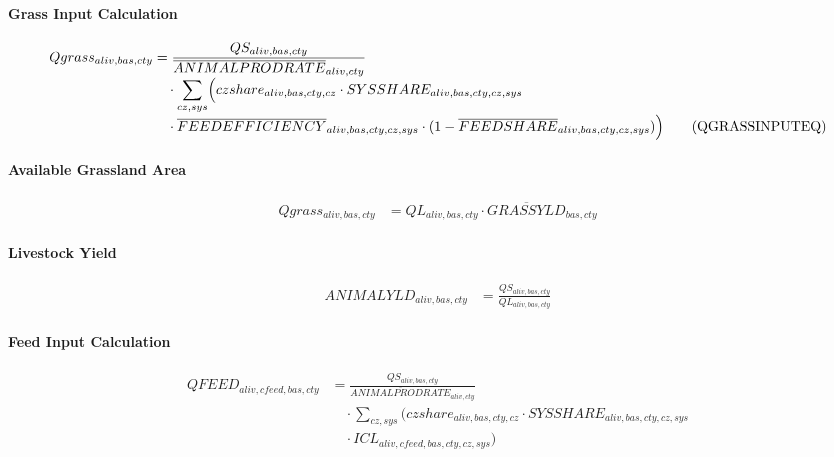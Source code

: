 \paragraph{Grass Input Calculation}
\begin{align}
  Qgrass_{aliv,bas,cty}
  &= 
     \frac{
       QS_{aliv,bas,cty}
     }{
       \overline{ANIMALPRODRATE}_{aliv,cty}
     }
     \nonumber\\[-0.3em]
  &\quad
     \cdot
     \sum_{cz,sys}
     \Bigl(
       czshare_{aliv,bas,cty,cz}
       \cdot
       SYSSHARE_{aliv,bas,cty,cz,sys}
       \nonumber\\[-0.3em]
  &\quad
       \cdot
       \overline{FEEDEFFICIENCY}_{aliv,bas,cty,cz,sys}
       \cdot
       (1 - \overline{FEEDSHARE}_{aliv,bas,cty,cz,sys})
     \Bigr)
  \tag{QGRASSINPUTEQ}\label{eq:QGRASSINPUTEQ}
\end{align}

\paragraph{Available Grassland Area}
\begin{align}
  Qgrass_{aliv,bas,cty}
  &=
     QL_{aliv,bas,cty}
     \cdot
     \overline{GRASSYLD}_{bas,cty}
  \tag{QLLIVINPUTEQ}\label{eq:QLLIVINPUTEQ}
\end{align}


\paragraph{Livestock Yield}
\begin{align}
  ANIMALYLD_{aliv,bas,cty}
  &= \frac{
       QS_{aliv,bas,cty}
     }{
       QL_{aliv,bas,cty}
     }
  \tag{ANIMALYLDEQ}\label{eq:ANIMALYLDEQ}
\end{align}

\paragraph{Feed Input Calculation}
\begin{align}
  QFEED_{aliv,cfeed,bas,cty}
  &= \frac{
       QS_{aliv,bas,cty}
     }{
       \overline{ANIMALPRODRATE}_{aliv,cty}
     }
     \nonumber\\[-0.3em]
  &\quad
     \cdot
     \sum_{cz,sys}
     \bigl(
       czshare_{aliv,bas,cty,cz}
       \cdot SYSSHARE_{aliv,bas,cty,cz,sys}
       \nonumber\\[-0.3em]
  &\quad
       \cdot ICL_{aliv,cfeed,bas,cty,cz,sys}
     \bigr)
  \tag{QFEEDINPUTEQ}\label{eq:QFEEDINPUTEQ}
\end{align}

